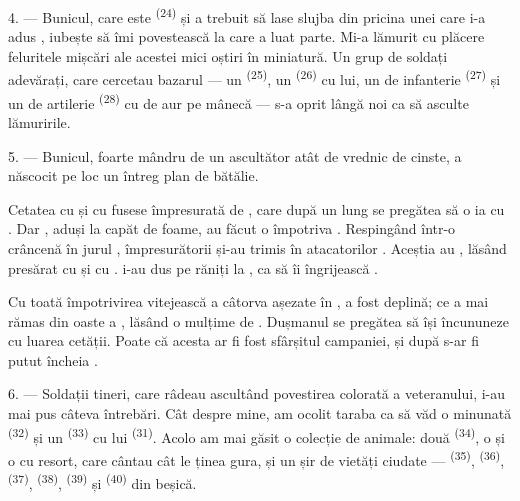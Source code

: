 \VUsaut{4.0mm}
\VUsaut{2.8mm}

4. --- Bunicul, care este  \textsuperscript{(24)} și a trebuit să
lase slujba din pricina unei  care i-a adus ,
iubește să îmi povestească  la care a luat parte. Mi-a lămurit
cu plăcere feluritele mișcări ale acestei mici oștiri în miniatură. Un grup de
soldați adevărați, care cercetau bazarul --- un 
\textsuperscript{(25)}, un  \textsuperscript{(26)} cu
 lui, un  de infanterie \textsuperscript{(27)} și
un  de artilerie \textsuperscript{(28)} cu  de aur pe
mânecă --- s-a oprit lângă noi ca să asculte lămuririle.

5. --- Bunicul, foarte mândru de un ascultător atât de vrednic de cinste, a
născocit pe loc un întreg plan de bătălie.

Cetatea cu  și cu  fusese împresurată de
, care după un lung  se pregătea să o
ia cu . Dar , aduși la capăt de foame, au
făcut o  împotriva  .
Respingând  într-o  crâncenă în jurul
, împresurătorii  și-au trimis
 în  atacatorilor . Aceștia
au , lăsând  presărat cu 
și cu .  i-au dus pe răniți la , ca să îi îngrijească .

Cu toată împotrivirea vitejească a câtorva  așezate în
,  a fost deplină; ce a mai rămas din oaste a
, lăsând o mulțime de . Dușmanul se pregătea să își
încununeze  cu luarea cetății. Poate că acesta ar fi fost
sfârșitul campaniei, și după  s-ar fi putut încheia
.

\VUsaut{4.4mm}
\VUsaut{2.8mm}

6. --- Soldații tineri, care râdeau ascultând povestirea colorată a veteranului, i-au
mai pus câteva întrebări. Cât despre mine, am ocolit taraba ca să văd o
 minunată \textsuperscript{(32)} și un 
\textsuperscript{(33)} cu  lui \textsuperscript{(31)}. Acolo am mai
găsit o colecție de animale: două 
\textsuperscript{(34)}, o  și o  cu resort,
care cântau cât le ținea gura, și un șir de vietăți ciudate ---
 \textsuperscript{(35)},  \textsuperscript{(36)},
 \textsuperscript{(37)}, 
\textsuperscript{(38)},  \textsuperscript{(39)} și
 \textsuperscript{(40)} din beșică.

